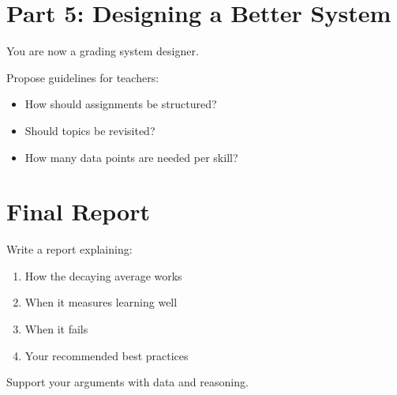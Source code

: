 \documentclass[12pt]{article}
\begin{document}
\section*{Part 5: Designing a Better System}

You are now a grading system designer.

Propose guidelines for teachers:

\begin{itemize}
    \item How should assignments be structured?
    \item Should topics be revisited?
    \item How many data points are needed per skill?
\end{itemize}

\vspace{3cm}

\section*{Final Report}

Write a report explaining:

\begin{enumerate}
    \item How the decaying average works
    \item When it measures learning well
    \item When it fails
    \item Your recommended best practices
\end{enumerate}

Support your arguments with data and reasoning.
\end{document}
